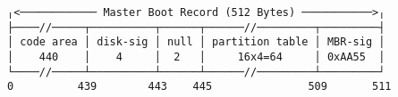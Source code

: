 \documentclass[varwidth=40em,crop]{standalone}
\begin{document}
\begin{verbatim}
╷<──────────── Master Boot Record (512 Bytes) ───────────>╷
├────//─────┬──────────┬──────┬──────//─────────┬─────────┤
│ code area │ disk-sig │ null │ partition table │ MBR-sig │  
│    440    │    4     │  2   │     16x4=64     │ 0xAA55  │
└────//─────┴──────────┴──────┴──────//─────────┴─────────┘
0          439        443    445               509       511
\end{verbatim}
\end{document}
